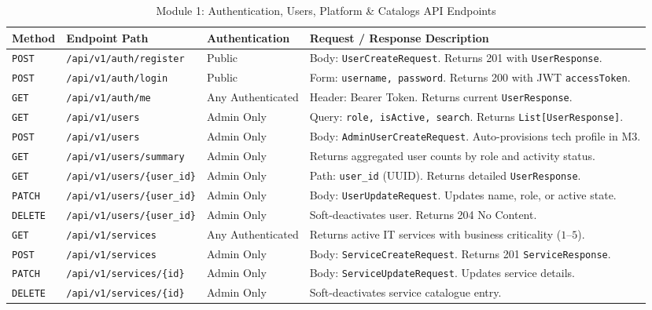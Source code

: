 \documentclass[11pt,a4paper,oneside]{report}
\begin{document}
\begin{table}[H]
\centering
\scriptsize
\caption{Module 1: Authentication, Users, Platform \& Catalogs API Endpoints}
\label{tab:app_routes_m1}
\begin{tabular}{p{1.2cm}p{5.5cm}p{2.5cm}p{5.0cm}}
\toprule
\textbf{Method} & \textbf{Endpoint Path} & \textbf{Authentication} & \textbf{Request / Response Description} \\
\midrule
\texttt{POST} & \texttt{/api/v1/auth/register} & Public & Body: \texttt{UserCreateRequest}. Returns 201 with \texttt{UserResponse}. \\
\texttt{POST} & \texttt{/api/v1/auth/login} & Public & Form: \texttt{username, password}. Returns 200 with JWT \texttt{accessToken}. \\
\texttt{GET} & \texttt{/api/v1/auth/me} & Any Authenticated & Header: Bearer Token. Returns current \texttt{UserResponse}. \\
\texttt{GET} & \texttt{/api/v1/users} & Admin Only & Query: \texttt{role, isActive, search}. Returns \texttt{List[UserResponse]}. \\
\texttt{POST} & \texttt{/api/v1/users} & Admin Only & Body: \texttt{AdminUserCreateRequest}. Auto-provisions tech profile in M3. \\
\texttt{GET} & \texttt{/api/v1/users/summary} & Admin Only & Returns aggregated user counts by role and activity status. \\
\texttt{GET} & \texttt{/api/v1/users/\{user\_id\}} & Admin Only & Path: \texttt{user\_id} (UUID). Returns detailed \texttt{UserResponse}. \\
\texttt{PATCH} & \texttt{/api/v1/users/\{user\_id\}} & Admin Only & Body: \texttt{UserUpdateRequest}. Updates name, role, or active state. \\
\texttt{DELETE} & \texttt{/api/v1/users/\{user\_id\}} & Admin Only & Soft-deactivates user. Returns 204 No Content. \\
\texttt{GET} & \texttt{/api/v1/services} & Any Authenticated & Returns active IT services with business criticality ($1$--$5$). \\
\texttt{POST} & \texttt{/api/v1/services} & Admin Only & Body: \texttt{ServiceCreateRequest}. Returns 201 \texttt{ServiceResponse}. \\
\texttt{PATCH} & \texttt{/api/v1/services/\{id\}} & Admin Only & Body: \texttt{ServiceUpdateRequest}. Updates service details. \\
\texttt{DELETE} & \texttt{/api/v1/services/\{id\}} & Admin Only & Soft-deactivates service catalogue entry. \\

\end{tabular}
\end{table}
\end{document}
